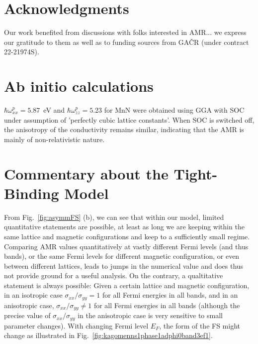\documentclass[prb,showpacs,amsmath,amssymb,superscriptaddress,twocolumn,floatfix]{revtex4-1}
\begin{document}
\section*{Acknowledgments}

Our work benefited from discussions with folks interested in AMR...
we express our gratitude to them as well as to funding sources from GA\v{C}R (under contract 22-21974S).
 
\begin{appendix}

\section{Ab initio calculations}
\label{apx_A}

$\hbar\omega^p_{xx}=5.87$~eV and $\hbar\omega^p_{zz}=5.23$ for MnN
were obtained using GGA with SOC under assumption of 'perfectly cubic
lattice constants'. When SOC is switched off, the anisotropy of the conductivity remains similar, indicating that the AMR is mainly of non-relativistic nature.

\section{Commentary about the Tight-Binding Model}
\label{apx_B}

From Fig.~\ref{fig:asymmFS} (b), we can see that within our model, limited quantitative statements are possible, at least as long we are keeping within the same lattice and magnetic configurations and keep to a sufficiently small regime. Comparing AMR values quantitatively at vastly different Fermi levels (and thus bands), or the same Fermi levels for different magnetic configuration, or even between different lattices, leads to jumps in the numerical value and does thus not provide ground for a useful analysis. On the contrary, a qualtitative statement is always possible: Given a certain lattice and magnetic configuration, in an isotropic case $\sigma_{xx} / \sigma_{yy} = 1$ for all Fermi energies in all bands, and in an anisotropic case, $\sigma_{xx} / \sigma_{yy} \neq 1$ for all Fermi energies in all bands (although the precise value of $\sigma_{xx} / \sigma_{yy}$ in the anisotropic case is very sensitive to small parameter changes). With changing Fermi level $E_F$, the form of the FS might change as illustrated in Fig.~\ref{fig:kagomenns1phase1adphi0band3ef1}.



\end{appendix}
\end{document}
